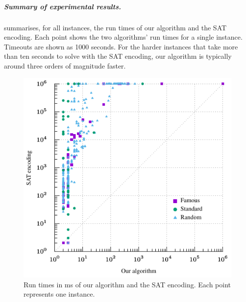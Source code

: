 {    %

    \subparagraph*{Summary of experimental results.}
     summarises, for all instances, the run times of our algorithm
    and the SAT encoding.  Each point shows the two algorithms' run times
    for a single instance.  Timeouts are shown as 1000 seconds.  For the harder instances that take more
    than ten seconds to solve with the SAT encoding, our algorithm is typically around three orders
    of magnitude faster.

    \begin{figure}[htb]
      \centering
      \includegraphics[scale=1.3]{60-treedepth/scatter}
      \caption{Run times in ms of our algorithm and the SAT encoding. Each point represents one instance.}
      \label{fig:runtimesscatter}
    \end{figure}

}
